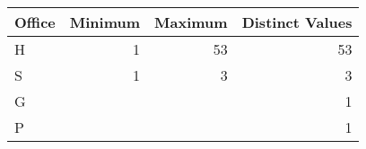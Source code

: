 
\begin{tabular}[t]{lrrr}
\toprule
Office & Minimum & Maximum & Distinct Values\\
\midrule
H & 1 & 53 & 53\\
S & 1 & 3 & 3\\
G &  &  & 1\\
P &  &  & 1\\
\bottomrule
\end{tabular}
